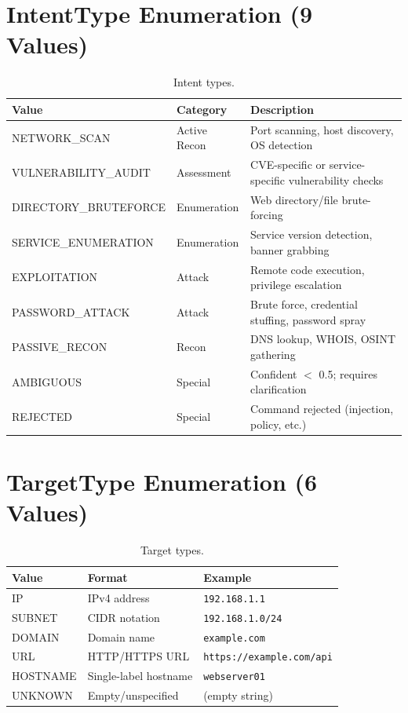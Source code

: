 ﻿\documentclass[10pt,journal,onecolumn]{IEEEtran}
\begin{document}
\section{IntentType Enumeration (9 Values)}
\begin{table}[t]
\caption{Intent types.}
\label{tab:appA}
\begin{tabularx}{\textwidth}{>{\ttfamily}l X >{\raggedright\arraybackslash}p{}}
\toprule
\textbf{Value} & \textbf{Category} & \textbf{Description}\\
\midrule
NETWORK\_SCAN & Active Recon & Port scanning, host discovery, OS detection\\
VULNERABILITY\_AUDIT & Assessment & CVE-specific or service-specific vulnerability checks\\
DIRECTORY\_BRUTEFORCE & Enumeration & Web directory/file brute-forcing\\
SERVICE\_ENUMERATION & Enumeration & Service version detection, banner grabbing\\
EXPLOITATION & Attack & Remote code execution, privilege escalation\\
PASSWORD\_ATTACK & Attack & Brute force, credential stuffing, password spray\\
PASSIVE\_RECON & Recon & DNS lookup, WHOIS, OSINT gathering\\
AMBIGUOUS & Special & Confident $<$ 0.5; requires clarification\\
REJECTED & Special & Command rejected (injection, policy, etc.)\\
\bottomrule
\end{tabularx}
\end{table}

\section{TargetType Enumeration (6 Values)}
\begin{table}[t]
\caption{Target types.}
\label{tab:appB}
\begin{tabularx}{\textwidth}{>{\ttfamily}l X X}
\toprule
\textbf{Value} & \textbf{Format} & \textbf{Example}\\
\midrule
IP & IPv4 address & \texttt{192.168.1.1}\\
SUBNET & CIDR notation & \texttt{192.168.1.0/24}\\
DOMAIN & Domain name & \texttt{example.com}\\
URL & HTTP/HTTPS URL & \texttt{https://example.com/api}\\
HOSTNAME & Single-label hostname & \texttt{webserver01}\\
UNKNOWN & Empty/unspecified & (empty string)\\
\bottomrule
\end{tabularx}
\end{table}
\end{document}
